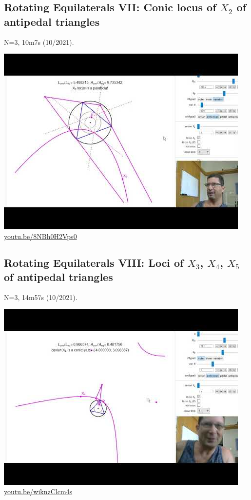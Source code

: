 \documentclass[12pt]{amsart}
\begin{document}
\subsection{Rotating Equilaterals VII: Conic locus of $X_{2}$ of antipedal triangles}
\label{vid:8NBh0H2Vps0}
\noindent N=3, 10m7s (10/2021). 
\begin{center}\includegraphics[width=.5\textwidth]{pics/8NBh0H2Vps0.jpg} \\ 
\href{https://youtu.be/8NBh0H2Vps0}{\url{youtu.be/8NBh0H2Vps0}}\end{center}
% 

\subsection{Rotating Equilaterals VIII: Loci of $X_{3}$, $X_{4}$, $X_{5}$ of antipedal triangles}
\label{vid:wiknzClcm4s}
\noindent N=3, 14m57s (10/2021). 
\begin{center}\includegraphics[width=.5\textwidth]{pics/wiknzClcm4s.jpg} \\ 
\href{https://youtu.be/wiknzClcm4s}{\url{youtu.be/wiknzClcm4s}}\end{center}
% 
\end{document}

